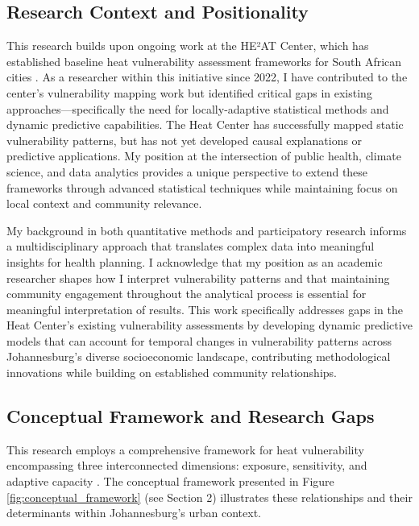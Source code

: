 \subsection{Research Context and Positionality}
This research builds upon ongoing work at the HE²AT Center, which has established baseline heat vulnerability assessment frameworks for South African cities \citep{Jack}. As a researcher within this initiative since 2022, I have contributed to the center's vulnerability mapping work but identified critical gaps in existing approaches—specifically the need for locally-adaptive statistical methods and dynamic predictive capabilities. The Heat Center has successfully mapped static vulnerability patterns, but has not yet developed causal explanations or predictive applications. My position at the intersection of public health, climate science, and data analytics provides a unique perspective to extend these frameworks through advanced statistical techniques while maintaining focus on local context and community relevance.

My background in both quantitative methods and participatory research informs a multidisciplinary approach that translates complex data into meaningful insights for health planning. I acknowledge that my position as an academic researcher shapes how I interpret vulnerability patterns and that maintaining community engagement throughout the analytical process is essential for meaningful interpretation of results. This work specifically addresses gaps in the Heat Center's existing vulnerability assessments by developing dynamic predictive models that can account for temporal changes in vulnerability patterns across Johannesburg's diverse socioeconomic landscape, contributing methodological innovations while building on established community relationships.

\subsection{Conceptual Framework and Research Gaps}

This research employs a comprehensive framework for heat vulnerability encompassing three interconnected dimensions: exposure, sensitivity, and adaptive capacity \citep{IPCC2022}. The conceptual framework presented in Figure \ref{fig:conceptual_framework} (see Section 2) illustrates these relationships and their determinants within Johannesburg's urban context.


